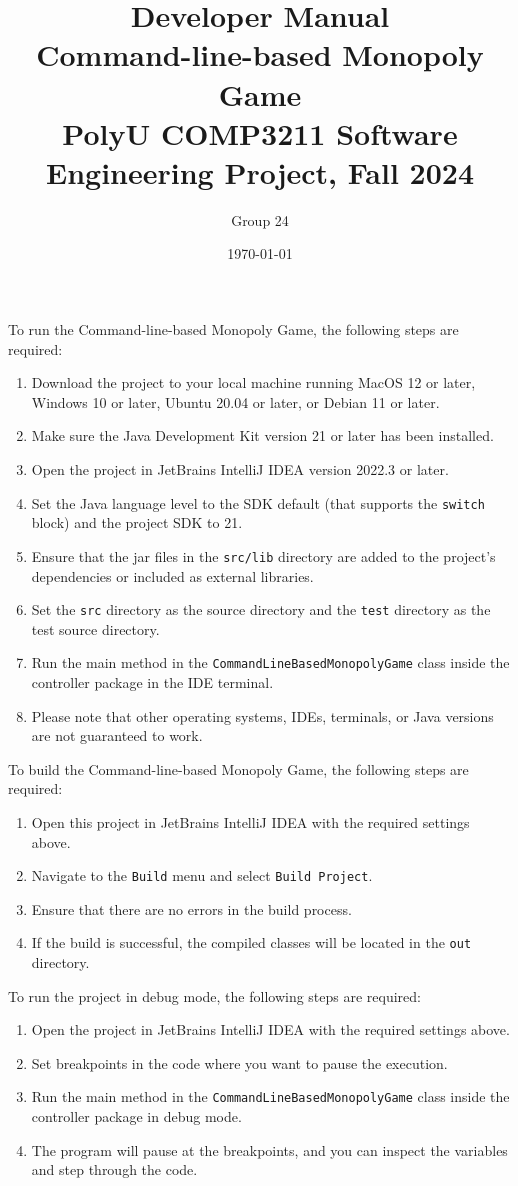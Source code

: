 \documentclass{article}
\title{\textbf{Developer Manual} \\ {\textbf{Command-line-based Monopoly Game}}\\ {\large PolyU COMP3211 Software Engineering Project, Fall 2024}}
\author{\large Group 24}
\date{\today}
\begin{document}
\maketitle{}

To run the Command-line-based Monopoly Game, the following steps are required:
\begin{enumerate}
    \item Download the project to your local machine running MacOS 12 or later, Windows 10 or later, Ubuntu 20.04 or later, or Debian 11 or later.
    \item Make sure the Java Development Kit version 21 or later has been installed.
    \item Open the project in JetBrains IntelliJ IDEA version 2022.3 or later.
    \item Set the Java language level to the SDK default (that supports the \texttt{switch} block) and the project SDK to 21.
    \item Ensure that the jar files in the \texttt{src/lib} directory are added to the project's dependencies or included as external libraries.
    \item Set the \texttt{src} directory as the source directory and the \texttt{test} directory as the test source directory.
    \item Run the main method in the \texttt{CommandLineBasedMonopolyGame} class inside the controller package in the IDE terminal.
    \item Please note that other operating systems, IDEs, terminals, or Java versions are not guaranteed to work.
\end{enumerate}

\vspace{0.5cm}

To build the Command-line-based Monopoly Game, the following steps are required:
\begin{enumerate}
    \item Open this project in JetBrains IntelliJ IDEA with the required settings above.
    \item Navigate to the \texttt{Build} menu and select \texttt{Build Project}.
    \item Ensure that there are no errors in the build process.
    \item If the build is successful, the compiled classes will be located in the \texttt{out} directory.
\end{enumerate}

\vspace{0.5cm}

To run the project in debug mode, the following steps are required:
\begin{enumerate}
    \item Open the project in JetBrains IntelliJ IDEA with the required settings above.
    \item Set breakpoints in the code where you want to pause the execution.
    \item Run the main method in the \texttt{CommandLineBasedMonopolyGame} class inside the controller package in debug mode.
    \item The program will pause at the breakpoints, and you can inspect the variables and step through the code.
\end{enumerate}
\end{document}
